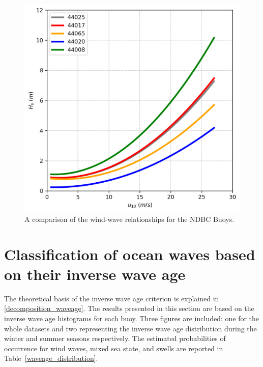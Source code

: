 \begin{figure}[H]
\centering
\includegraphics[width=0.8\linewidth]{Figures/Chapter5/wind_wave_5buoys.png}
\caption{A comparison of the wind-wave relationships for the NDBC Buoys.}
\label{fig:wind_wave_buoys}
\end{figure}


\pagebreak


\section{Classification of ocean waves based on their inverse wave age}\label{inverse_wave_age}

The theoretical basis of the inverse wave age criterion is explained in \ref{decomposition_waveage}. The results presented in this section are based on the inverse wave age histograms for each buoy. Three figures are included: one for the whole datasets and two representing the inverse wave age distribution during the winter and summer seasons respectively. The estimated probabilities of occurrence for wind waves, mixed sea state, and swells are reported in Table~\ref{waveage_distribution}.



